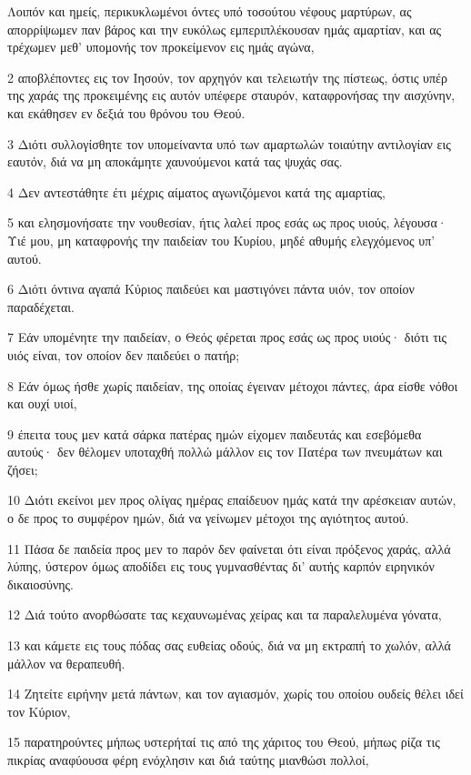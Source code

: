\par Λοιπόν και ημείς, περικυκλωμένοι όντες υπό τοσούτου νέφους μαρτύρων, ας απορρίψωμεν παν βάρος και την ευκόλως εμπεριπλέκουσαν ημάς αμαρτίαν, και ας τρέχωμεν μεθ' υπομονής τον προκείμενον εις ημάς αγώνα,
\par 2 αποβλέποντες εις τον Ιησούν, τον αρχηγόν και τελειωτήν της πίστεως, όστις υπέρ της χαράς της προκειμένης εις αυτόν υπέφερε σταυρόν, καταφρονήσας την αισχύνην, και εκάθησεν εν δεξιά του θρόνου του Θεού.
\par 3 Διότι συλλογίσθητε τον υπομείναντα υπό των αμαρτωλών τοιαύτην αντιλογίαν εις εαυτόν, διά να μη αποκάμητε χαυνούμενοι κατά τας ψυχάς σας.
\par 4 Δεν αντεστάθητε έτι μέχρις αίματος αγωνιζόμενοι κατά της αμαρτίας,
\par 5 και ελησμονήσατε την νουθεσίαν, ήτις λαλεί προς εσάς ως προς υιούς, λέγουσα· Υιέ μου, μη καταφρονής την παιδείαν του Κυρίου, μηδέ αθυμής ελεγχόμενος υπ' αυτού.
\par 6 Διότι όντινα αγαπά Κύριος παιδεύει και μαστιγόνει πάντα υιόν, τον οποίον παραδέχεται.
\par 7 Εάν υπομένητε την παιδείαν, ο Θεός φέρεται προς εσάς ως προς υιούς· διότι τις υιός είναι, τον οποίον δεν παιδεύει ο πατήρ;
\par 8 Εάν όμως ήσθε χωρίς παιδείαν, της οποίας έγειναν μέτοχοι πάντες, άρα είσθε νόθοι και ουχί υιοί,
\par 9 έπειτα τους μεν κατά σάρκα πατέρας ημών είχομεν παιδευτάς και εσεβόμεθα αυτούς· δεν θέλομεν υποταχθή πολλώ μάλλον εις τον Πατέρα των πνευμάτων και ζήσει;
\par 10 Διότι εκείνοι μεν προς ολίγας ημέρας επαίδευον ημάς κατά την αρέσκειαν αυτών, ο δε προς το συμφέρον ημών, διά να γείνωμεν μέτοχοι της αγιότητος αυτού.
\par 11 Πάσα δε παιδεία προς μεν το παρόν δεν φαίνεται ότι είναι πρόξενος χαράς, αλλά λύπης, ύστερον όμως αποδίδει εις τους γυμνασθέντας δι' αυτής καρπόν ειρηνικόν δικαιοσύνης.
\par 12 Διά τούτο ανορθώσατε τας κεχαυνωμένας χείρας και τα παραλελυμένα γόνατα,
\par 13 και κάμετε εις τους πόδας σας ευθείας οδούς, διά να μη εκτραπή το χωλόν, αλλά μάλλον να θεραπευθή.
\par 14 Ζητείτε ειρήνην μετά πάντων, και τον αγιασμόν, χωρίς του οποίου ουδείς θέλει ιδεί τον Κύριον,
\par 15 παρατηρούντες μήπως υστερήταί τις από της χάριτος του Θεού, μήπως ρίζα τις πικρίας αναφύουσα φέρη ενόχλησιν και διά ταύτης μιανθώσι πολλοί,
